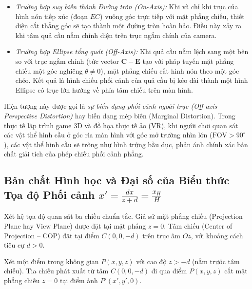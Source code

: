 \begin{itemize}
    \item \textit{Trường hợp suy biến thành Đường tròn (On-Axis):} Khi và chỉ khi trục của hình nón tiếp xúc (đoạn $EC$) vuông góc trực tiếp với mặt phẳng chiếu, thiết diện cắt thẳng góc sẽ tạo thành một đường tròn hoàn hảo. Điều này xảy ra khi tâm quả cầu nằm chính diện trên trục ngắm chính của camera.
    \item \textit{Trường hợp Ellipse tổng quát (Off-Axis):} Khi quả cầu nằm lệch sang một bên so với trục ngắm chính (tức vector $\mathbf{C} - \mathbf{E}$ tạo với pháp tuyến mặt phẳng chiếu một góc nghiêng $\theta \neq 0$), mặt phẳng chiếu cắt hình nón theo một góc chéo. Kết quả là hình chiếu phối cảnh của quả cầu bị kéo dài thành một hình Ellipse có trục lớn hướng về phía tâm chiếu trên màn hình.
\end{itemize}

Hiện tượng này được gọi là \textit{sự biến dạng phối cảnh ngoài trục (Off-axis Perspective Distortion)} hay biến dạng mép biên (Marginal Distortion). Trong thực tế lập trình game 3D và đồ họa thực tế ảo (VR), khi người chơi quan sát các vật thể hình cầu ở góc rìa màn hình với góc mở trường nhìn lớn ($\text{FOV} > 90^\circ$), các vật thể hình cầu sẽ trông như hình trứng bầu dục, phản ánh chính xác bản chất giải tích của phép chiếu phối cảnh phẳng.

\subsection{Bản chất Hình học và Đại số của Biểu thức Tọa độ Phối cảnh \texorpdfstring{$x' = \frac{dx}{z+d} = \frac{x_H}{H}$}{x' = dx/(z+d) = xH/H}}
\label{subsec:perspective_coordinate_derivation}

Xét hệ tọa độ quan sát ba chiều chuẩn tắc. Giả sử mặt phẳng chiếu (Projection Plane hay View Plane) được đặt tại mặt phẳng $z = 0$. Tâm chiếu (Center of Projection -- COP) đặt tại điểm $C(0, 0, -d)$ trên trục âm $Oz$, với khoảng cách tiêu cự $d > 0$.

Xét một điểm trong không gian $P(x, y, z)$ với cao độ $z > -d$ (nằm trước tâm chiếu). Tia chiếu phát xuất từ tâm $C(0, 0, -d)$ đi qua điểm $P(x, y, z)$ cắt mặt phẳng chiếu $z = 0$ tại điểm ảnh $P'(x', y', 0)$.


